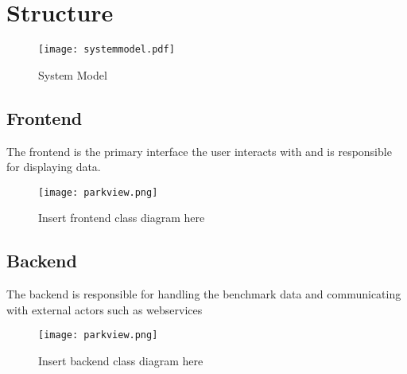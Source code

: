 \section{Structure}
\begin{figure}[h]
	\centering
	\texttt{[image: systemmodel.pdf]}
	\caption{System Model}
\end{figure}

\subsection{Frontend}
The frontend is the primary interface the user interacts with and is responsible for displaying data.
\begin{figure}[h]
	\centering
	\texttt{[image: parkview.png]}
	\caption{Insert frontend class diagram here}
\end{figure}

\subsection{Backend}
The backend is responsible for handling the benchmark data and communicating with external actors such as webservices
\begin{figure}[h]
	\centering
	\texttt{[image: parkview.png]}
	\caption{Insert backend class diagram here}
\end{figure}
